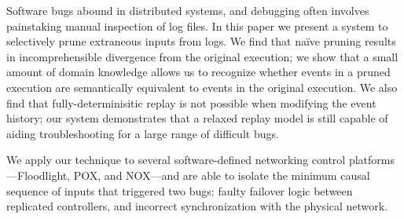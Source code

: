 Software bugs abound in distributed systems, and debugging
often involves painstaking manual inspection of log files.
In this paper we present a system to selectively prune extraneous
inputs from logs. We find that na\"ive pruning
results in incomprehensible divergence from the original execution; we show
that a small amount of domain knowledge allows us to recognize whether events in
a pruned execution are semantically equivalent to events in the original
execution. We also find that fully-determinisitic replay is not possible
when modifying the event history; our system demonstrates that a relaxed
replay model is still capable of
aiding troubleshooting for a large range of difficult bugs.

We apply our technique to several software-defined networking control
platforms---Floodlight, POX, and NOX---and
are able to isolate the minimum causal sequence of inputs that triggered
two bugs: faulty failover logic between replicated controllers, and incorrect
synchronization with the physical network.
